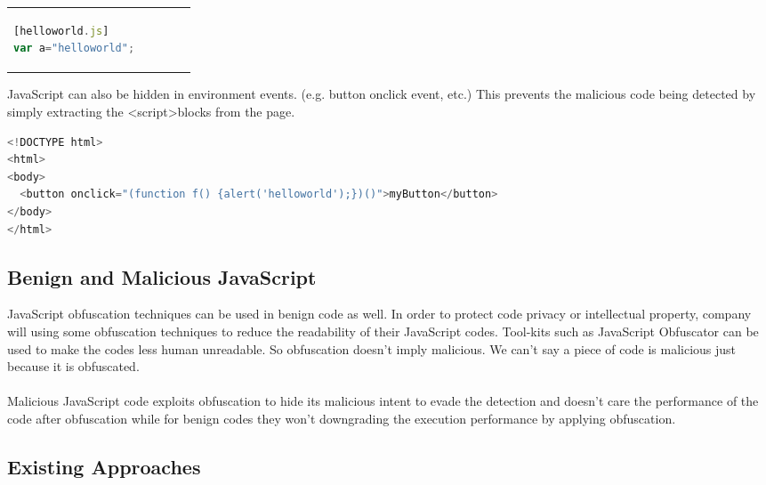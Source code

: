 \begin{enumerate}
\begin{tabular}{p{4cm}p{0.02cm}p{4cm}p{0.02cm}p{5.6cm}}
\begin{lstlisting}[language=JavaScript,alsolanguage=HTML5,  title=(remote source file)]
[helloworld.js]
var a="helloworld";
			\end{lstlisting} 
	\end{tabular}  	 	
JavaScript can also be hidden in environment events. (e.g. button onclick event, etc.) This prevents the malicious code being detected by simply extracting the \textless script\textgreater blocks from the page. 
	\begin{lstlisting}[language=JavaScript,alsolanguage=HTML5, title=(script in events)]
<!DOCTYPE html>
<html>
<body>
  <button onclick="(function f() {alert('helloworld');})()">myButton</button>
</body>
</html>
  		\end{lstlisting} 	
\end{enumerate}
\newpage

\subsection{Benign and Malicious JavaScript}
JavaScript obfuscation techniques can be used in benign code as well. In order to protect code privacy or intellectual property, company will using some obfuscation techniques to reduce the readability of their JavaScript codes. Tool-kits such as JavaScript Obfuscator \cite{JSObfuscator} can be used to make the codes less human unreadable. So obfuscation doesn't imply malicious. We can't say a piece of code is malicious just because it is obfuscated.\\ \\
Malicious JavaScript code exploits obfuscation to hide its malicious intent to evade the detection and doesn't care the performance of the code after obfuscation while for benign codes they won't downgrading the execution performance by applying obfuscation.

\subsection{Existing Approaches} 
